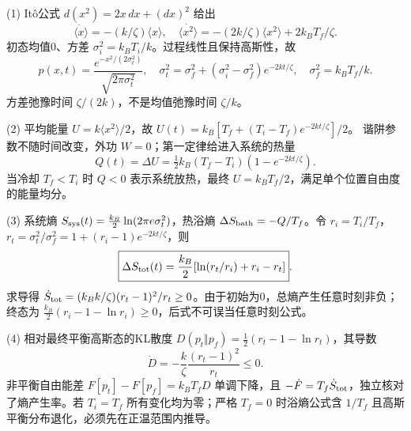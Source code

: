 (1) Itô公式 \(d(x^2)=2x\,dx+(dx)^2\) 给出
\[
\dot{\langle x\rangle}=-(k/\zeta)\langle x\rangle,\quad
\dot{\langle x^2\rangle}=-(2k/\zeta)\langle x^2\rangle+2k_BT_f/\zeta.
\]
初态均值0、方差 \(\sigma_i^2=k_BT_i/k\)。过程线性且保持高斯性，故
\[
p(x,t)=\frac{e^{-x^2/(2\sigma_t^2)}}{\sqrt{2\pi\sigma_t^2}},\quad
\boxed{\sigma_t^2=\sigma_f^2+(\sigma_i^2-\sigma_f^2)e^{-2kt/\zeta}},
\quad\sigma_f^2=k_BT_f/k.
\]
方差弛豫时间 \(\zeta/(2k)\)，不是均值弛豫时间 \(\zeta/k\)。

(2) 平均能量 \(U=k\langle x^2\rangle/2\)，故
\(U(t)=k_B[T_f+(T_i-T_f)e^{-2kt/\zeta}]/2\)。
谐阱参数不随时间改变，外功 \(W=0\)；第一定律给进入系统的热量
\[
\boxed{Q(t)=\Delta U=\tfrac12k_B(T_f-T_i)(1-e^{-2kt/\zeta})}.
\]
当冷却 \(T_f<T_i\) 时 \(Q<0\) 表示系统放热，最终 \(U=k_BT_f/2\)，满足单个位置自由度的能量均分。

(3) 系统熵 \(S_{\rm sys}(t)=\tfrac{k_B}{2}\ln(2\pi e\sigma_t^2)\)，热浴熵 \(\Delta S_{\rm bath}=-Q/T_f\)。令 \(r_i=T_i/T_f\)，\(r_t=\sigma_t^2/\sigma_f^2=1+(r_i-1)e^{-2kt/\zeta}\)，则
\[
\boxed{\Delta S_{\rm tot}(t)=\frac{k_B}{2}[\ln(r_t/r_i)+r_i-r_t]}.
\]
求导得 \(\dot S_{\rm tot}=(k_Bk/\zeta)(r_t-1)^2/r_t\ge0\)。由于初始为0，总熵产生任意时刻非负；终态为 \(\tfrac{k_B}{2}(r_i-1-\ln r_i)\ge0\)，后式不可误当任意时刻公式。

(4) 相对最终平衡高斯态的KL散度
\(D(p_t\Vert p_f)=\tfrac12(r_t-1-\ln r_t)\)，其导数
\[
\dot D=-\frac{k}{\zeta}\frac{(r_t-1)^2}{r_t}\le0.
\]
非平衡自由能差 \(F[p_t]-F[p_f]=k_BT_fD\) 单调下降，且 \(-\dot F=T_f\dot S_{\rm tot}\)，独立核对了熵产生率。若 \(T_i=T_f\) 所有变化均为零；严格 \(T_f=0\) 时浴熵公式含 \(1/T_f\) 且高斯平衡分布退化，必须先在正温范围内推导。
